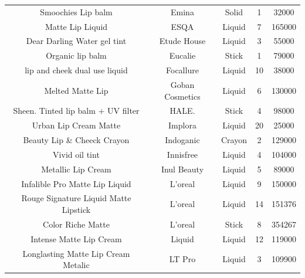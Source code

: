 \documentclass{article}
\begin{document}
\begin{longtable}{ccccc}
    Smoochies Lip balm                      & Emina             & Solid                        & 1               & 32000          \\
    Matte Lip Liquid                        & ESQA              & Liquid                       & 7               & 165000         \\
    Dear Darling Water gel tint             & Etude House       & Liquid                       & 3               & 55000          \\
    Organic lip balm                        & Eucalie           & Stick                        & 1               & 79000          \\
    lip and cheek dual use liquid           & Focallure         & Liquid                       & 10              & 38000          \\
    Melted Matte Lip                        & Goban Cosmetics   & Liquid                       & 6               & 130000         \\
    Sheen. Tinted lip balm + UV filter      & HALE.             & Stick                        & 4               & 98000          \\
    Urban Lip Cream Matte                   & Implora           & Liquid                       & 20              & 25000          \\
    Beauty Lip \& Cheeck Crayon             & Indoganic         & Crayon                       & 2               & 129000         \\
    Vivid oil tint                          & Innisfree         & Liquid                       & 4               & 104000         \\
    Metallic Lip Cream                      & Inul Beauty       & Liquid                       & 5               & 89000          \\
    Infalible Pro Matte Lip Liquid          & L'oreal           & Liquid                       & 9               & 150000         \\
    Rouge Signature Liquid Matte Lipstick   & L'oreal           & Liquid                       & 14              & 151376         \\
    Color Riche Matte                       & L'oreal           & Stick                        & 8               & 354267         \\
    Intense Matte Lip Cream                 & Liquid            & Liquid                       & 12              & 119000         \\
    Longlasting Matte Lip Cream Metalic     & LT Pro            & Liquid                       & 3               & 109900         \\

\end{longtable}
\end{document}
